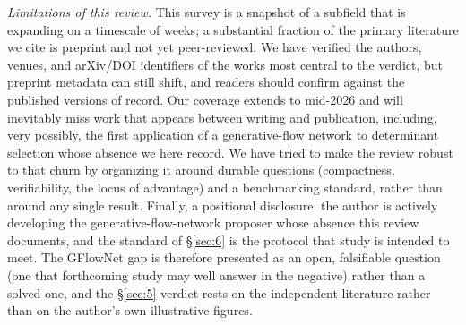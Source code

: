 \documentclass[11pt]{article}
\begin{document}
\emph{Limitations of this review.} This survey is a snapshot of a subfield that is expanding on a timescale of weeks; a substantial fraction of the primary literature we cite is preprint and not yet peer-reviewed. We have verified the authors, venues, and arXiv/DOI identifiers of the works most central to the verdict, but preprint metadata can still shift, and readers should confirm against the published versions of record. Our coverage extends to mid-2026 and will inevitably miss work that appears between writing and publication, including, very possibly, the first application of a generative-flow network to determinant selection whose absence we here record. We have tried to make the review robust to that churn by organizing it around durable questions (compactness, verifiability, the locus of advantage) and a benchmarking standard, rather than around any single result. Finally, a positional disclosure: the author is actively developing the generative-flow-network proposer whose absence this review documents, and the standard of \S\ref{sec:6} is the protocol that study is intended to meet. The GFlowNet gap is therefore presented as an open, falsifiable question (one that forthcoming study may well answer in the negative) rather than a solved one, and the \S\ref{sec:5} verdict rests on the independent literature rather than on the author's own illustrative figures.
\end{document}
